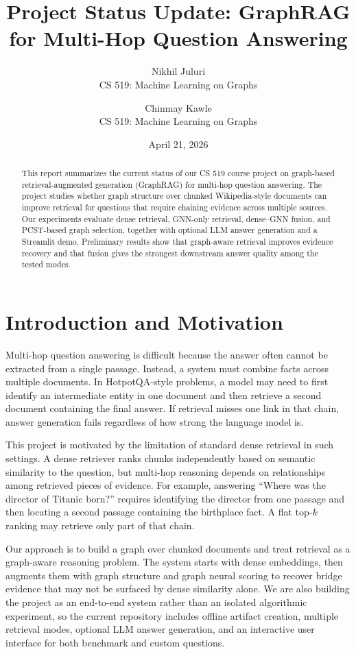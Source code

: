 \documentclass[10pt]{article}
\title{Project Status Update: GraphRAG for Multi-Hop Question Answering}
\author{
  Nikhil Juluri \\
  CS 519: Machine Learning on Graphs
  \and
  Chinmay Kawle \\
  CS 519: Machine Learning on Graphs
}
\date{April 21, 2026}
\begin{document}
\maketitle
\small

\begin{abstract}
This report summarizes the current status of our CS 519 course project on graph-based retrieval-augmented generation (GraphRAG) for multi-hop question answering. The project studies whether graph structure over chunked Wikipedia-style documents can improve retrieval for questions that require chaining evidence across multiple sources. Our experiments evaluate dense retrieval, GNN-only retrieval, dense--GNN fusion, and PCST-based graph selection, together with optional LLM answer generation and a Streamlit demo. Preliminary results show that graph-aware retrieval improves evidence recovery and that fusion gives the strongest downstream answer quality among the tested modes.
\end{abstract}

\section{Introduction and Motivation}

Multi-hop question answering is difficult because the answer often cannot be extracted from a single passage. Instead, a system must combine facts across multiple documents. In HotpotQA-style problems, a model may need to first identify an intermediate entity in one document and then retrieve a second document containing the final answer. If retrieval misses one link in that chain, answer generation fails regardless of how strong the language model is.

This project is motivated by the limitation of standard dense retrieval in such settings. A dense retriever ranks chunks independently based on semantic similarity to the question, but multi-hop reasoning depends on relationships among retrieved pieces of evidence. For example, answering ``Where was the director of Titanic born?'' requires identifying the director from one passage and then locating a second passage containing the birthplace fact. A flat top-$k$ ranking may retrieve only part of that chain.

Our approach is to build a graph over chunked documents and treat retrieval as a graph-aware reasoning problem. The system starts with dense embeddings, then augments them with graph structure and graph neural scoring to recover bridge evidence that may not be surfaced by dense similarity alone. We are also building the project as an end-to-end system rather than an isolated algorithmic experiment, so the current repository includes offline artifact creation, multiple retrieval modes, optional LLM answer generation, and an interactive user interface for both benchmark and custom questions.
\end{document}
